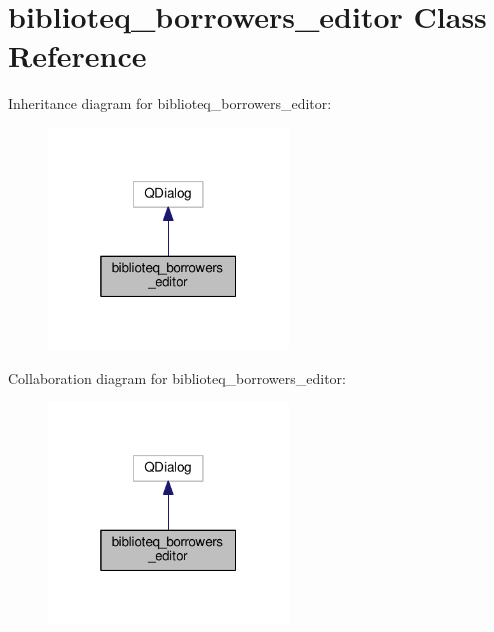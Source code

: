 \hypertarget{classbiblioteq__borrowers__editor}{}\section{biblioteq\+\_\+borrowers\+\_\+editor Class Reference}
\label{classbiblioteq__borrowers__editor}


Inheritance diagram for biblioteq\+\_\+borrowers\+\_\+editor\+:
\nopagebreak
\begin{figure}[H]
\begin{center}
\leavevmode
\includegraphics[width=181pt]{classbiblioteq__borrowers__editor__inherit__graph}
\end{center}
\end{figure}


Collaboration diagram for biblioteq\+\_\+borrowers\+\_\+editor\+:
\nopagebreak
\begin{figure}[H]
\begin{center}
\leavevmode
\includegraphics[width=181pt]{classbiblioteq__borrowers__editor__coll__graph}
\end{center}
\end{figure}
